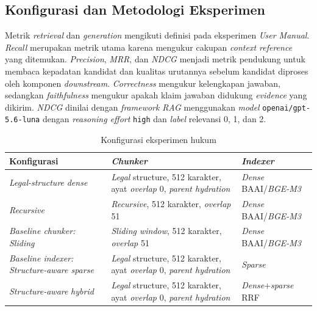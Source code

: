 \subsection{Konfigurasi dan Metodologi Eksperimen}
\label{subsec:legal-revision-config-updated}
\label{subsec:legal-revision-config}

Metrik \emph{retrieval} dan \emph{generation} mengikuti definisi pada eksperimen \emph{User Manual}.
\emph{Recall} merupakan metrik utama karena mengukur cakupan \emph{context reference} yang
ditemukan. \emph{Precision}, \emph{MRR}, dan \emph{NDCG} menjadi metrik pendukung untuk membaca kepadatan
kandidat dan kualitas urutannya sebelum kandidat diproses oleh komponen \emph{downstream}.
\emph{Correctness} mengukur kelengkapan jawaban, sedangkan \emph{faithfulness} mengukur apakah klaim
jawaban didukung \emph{evidence} yang dikirim. \emph{NDCG} dinilai dengan \emph{framework} \emph{RAG} menggunakan
\emph{model} \texttt{openai/gpt-5.6-luna} dengan \emph{reasoning effort} \texttt{high} dan \emph{label} relevansi 0, 1, dan 2.

\begin{table}[H]\centering\scriptsize
\caption{Konfigurasi eksperimen hukum}
\label{tab:legal-revision-config-updated}
\begin{tabularx}{\textwidth}{@{}>{\RaggedRight\arraybackslash}p{3.6cm}>{\RaggedRight\arraybackslash}p{4.5cm}>{\RaggedRight\arraybackslash}X@{}}
\toprule\textbf{Konfigurasi} & \textbf{\emph{Chunker}} & \textbf{\emph{Indexer}}\\\midrule
\emph{Legal-structure} \emph{dense} & \emph{Legal} structure, 512 karakter, ayat \emph{overlap} 0, \emph{parent hydration} & \emph{Dense} BAAI/\emph{BGE-M3}\\
\emph{Recursive} & \emph{Recursive}, 512 karakter, \emph{overlap} 51 & \emph{Dense} BAAI/\emph{BGE-M3}\\
\emph{Baseline chunker: Sliding} & \emph{Sliding window}, 512 karakter, \emph{overlap} 51 & \emph{Dense} BAAI/\emph{BGE-M3}\\
\emph{Baseline indexer: Structure-aware sparse} & \emph{Legal} structure, 512 karakter, ayat \emph{overlap} 0, \emph{parent hydration} & \emph{Sparse}\\
\emph{Structure-aware} \emph{hybrid} & \emph{Legal} structure, 512 karakter, ayat \emph{overlap} 0, \emph{parent hydration} & \emph{Dense}+\emph{sparse} RRF\\
\bottomrule\end{tabularx}
\end{table}


